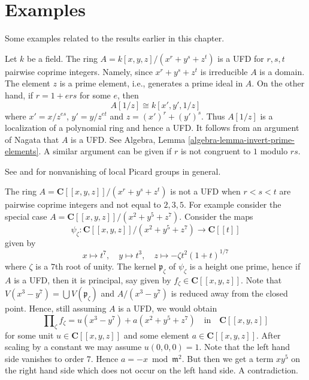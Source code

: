 \section{Examples}
\label{section-examples}

\noindent
Some examples related to the results earlier in this chapter.

\begin{example}
\label{example-factorial}
\begin{reference}
\cite[4(c)]{Samuel-UFD}
\end{reference}
Let $k$ be a field. The ring $A = k[x, y, z]/(x^r + y^s + z^t)$
is a UFD for $r, s, t$ pairwise coprime integers. Namely, since
$x^r + y^s + z^t$ is irreducible $A$ is a domain. The element $z$
is a prime element, i.e., generates a prime ideal in $A$.
On the other hand, if $r = 1 + ers$ for some $e$, then
$$
A[1/z] \cong k[x', y', 1/z]
$$
where $x' = x/z^{es}$, $y' = y/z^{et}$ and $z = (x')^r + (y')^s$.
Thus $A[1/z]$ is a localization of a polynomial ring and hence
a UFD. It follows from an argument of Nagata that $A$ is a UFD.
See Algebra, Lemma \ref{algebra-lemma-invert-prime-elements}.
A similar argument can be given if $r$ is not congruent to $1$
modulo $rs$.
\end{example}

\begin{example}
\label{example-completion-not-factorial}
\begin{reference}
See \cite{Brieskorn} and \cite{Lipman-rational} for nonvanishing of
local Picard groups in general.
\end{reference}
The ring $A = \mathbf{C}[[x, y, z]]/(x^r + y^s + z^t)$
is not a UFD when $r < s < t$ are pairwise coprime integers
and not equal to $2, 3, 5$. For example consider the special
case $A = \mathbf{C}[[x, y, z]]/(x^2 + y^5 + z^7)$.
Consider the maps
$$
\psi_\zeta : \mathbf{C}[[x, y, z]]/(x^2 + y^5 + z^7) \to \mathbf{C}[[t]]
$$
given by
$$
x \mapsto t^7,\quad
y \mapsto t^3,\quad
z \mapsto -\zeta t^2(1 + t)^{1/7}
$$
where $\zeta$ is a $7$th root of unity. The kernel $\mathfrak p_\zeta$
of $\psi_\zeta$ is a height one prime, hence if $A$ is a UFD, then
it is principal, say given by $f_\zeta \in \mathbf{C}[[x, y, z]]$.
Note that $V(x^3 - y^7) = \bigcup V(\mathfrak p_\zeta)$
and $A/(x^3 - y^7)$ is reduced away from the closed point. Hence,
still assuming $A$ is a UFD, we would obtain
$$
\prod\nolimits_\zeta f_\zeta = u(x^3 - y^7) + a(x^2 + y^5 + z^7)
\quad\text{in}\quad
\mathbf{C}[[x, y, z]]
$$
for some unit $u \in \mathbf{C}[[x, y, z]]$ and some
element $a \in \mathbf{C}[[x, y, z]]$. After scaling by a constant
we may assume $u(0, 0, 0) = 1$. Note that the left hand side vanishes to
order $7$. Hence $a = - x \bmod \mathfrak m^2$. But then we get a term
$xy^5$ on the right hand side which does not occur on the left
hand side. A contradiction.
\end{example}

